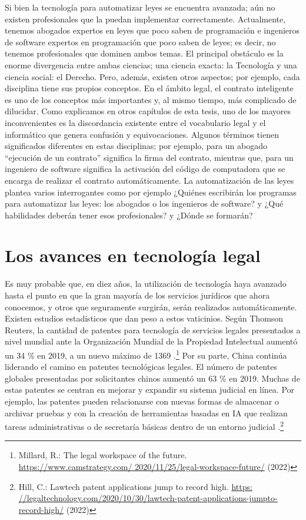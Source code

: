 \documentclass[12pt]{report} %
\begin{document}
Si bien la tecnología para automatizar leyes se encuentra avanzada; aún no existen profesionales que la puedan implementar correctamente. Actualmente, tenemos abogados expertos en leyes que poco saben de programación e ingenieros de software expertos en programación que poco saben de leyes; es decir, no tenemos profesionales que dominen ambos temas. El principal obstáculo es la enorme divergencia entre ambas ciencias; una ciencia exacta: la Tecnología y una ciencia social: el Derecho. Pero, además, existen otros aspectos; por ejemplo, cada disciplina tiene sus propios conceptos. En el ámbito legal, el contrato inteligente es uno de los conceptos más importantes y, al mismo tiempo, más complicado de dilucidar. Como explicamos en otros capítulos de esta tesis, uno de los mayores inconvenientes es la discordancia existente entre el vocabulario legal y el informático que genera confusión y equivocaciones. Algunos términos tienen significados diferentes en estas disciplinas; por ejemplo, para un abogado “ejecución de un contrato” significa la firma del contrato, mientras que, para un ingeniero de software significa la activación del código de computadora que se encarga de realizar el contrato automáticamente. La automatización de las leyes plantea varios interrogantes como por ejemplo ¿Quiénes escribirán los programas para automatizar las leyes: los abogados o los ingenieros de software? y ¿Qué habilidades deberán tener esos profesionales? y ¿Dónde se formarán? 

\section{Los avances en tecnología legal }

Es muy probable que, en diez años, la utilización de tecnología haya avanzado hasta el punto en que la gran mayoría de los servicios jurídicos que ahora conocemos, y otros que seguramente surgirán, serán realizados automáticamente. Existen estudios estadísticos que dan peso a estos vaticinios. Según Thomson Reuters, la cantidad de patentes para tecnología de servicios legales presentados a nivel mundial ante la Organización Mundial de la Propiedad Intelectual aumentó un 34 \% en 2019, a un nuevo máximo de 1369 .\footnote{Millard, R.: The legal workspace of the future. \url{https://www.camstrategy.com/ 2020/11/25/legal-workspace-future/} (2022)} Por su parte, China continúa liderando el camino en patentes tecnológicas legales. El número de patentes globales presentadas por solicitantes chinos aumentó un 63 \% en 2019. Muchas de estas patentes se centran en mejorar y expandir su sistema judicial en línea. Por ejemplo, las patentes pueden relacionarse con nuevas formas de almacenar o archivar pruebas y con la creación de herramientas basadas en IA que realizan tareas administrativas o de secretaría básicas dentro de un entorno judicial .\footnote{Hill, C.: Lawtech patent applications jump to record high. \url{https: //legaltechnology.com/2020/10/30/lawtech-patent-applications-jumpto-record-high/} (2022)} 
\end{document}
